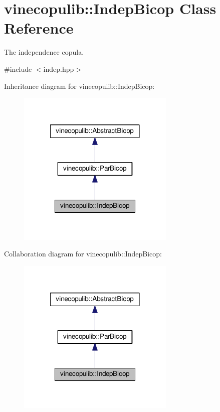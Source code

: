 \hypertarget{classvinecopulib_1_1_indep_bicop}{\section{vinecopulib\+:\+:Indep\+Bicop Class Reference}
\label{classvinecopulib_1_1_indep_bicop}
}


The independence copula.  




{\ttfamily \#include $<$indep.\+hpp$>$}



Inheritance diagram for vinecopulib\+:\+:Indep\+Bicop\+:\nopagebreak
\begin{figure}[H]
\begin{center}
\leavevmode
\includegraphics[width=212pt]{classvinecopulib_1_1_indep_bicop__inherit__graph}
\end{center}
\end{figure}


Collaboration diagram for vinecopulib\+:\+:Indep\+Bicop\+:\nopagebreak
\begin{figure}[H]
\begin{center}
\leavevmode
\includegraphics[width=212pt]{classvinecopulib_1_1_indep_bicop__coll__graph}
\end{center}
\end{figure}
